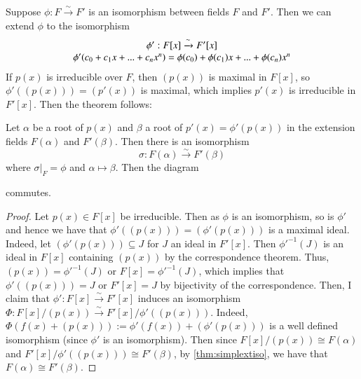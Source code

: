 \documentclass[12pt, a4paper, oneside, openright, titlepage]{book}
\begin{document}
\begin{rmk}
    Suppose $\phi:F\xrightarrow{\sim} F'$ is an isomorphism between fields $F$ and $F'$. Then we can extend $\phi$ to the isomorphism \begin{equation}
        \begin{array}{c} \phi':F[x]\xrightarrow{\sim}{F'[x]} \\ \phi'(c_0+c_1x+...+c_nx^n) = \phi(c_0)+\phi(c_1)x+...+\phi(c_n)x^n \end{array}
    \end{equation}
    If $p(x)$ is irreducible over $F$, then $(p(x))$ is maximal in $F[x]$, so $\phi'((p(x))) = (p'(x))$ is maximal, which implies $p'(x)$ is irreducible in $F'[x]$. Then the theorem follows:
\end{rmk}


\begin{thm}
    Let $\alpha$ be a root of $p(x)$ and $\beta$ a root of $p'(x) = \phi'(p(x))$ in the extension fields $F(\alpha)$ and $F'(\beta)$. Then there is an isomorphism \begin{equation}
        \sigma:F(\alpha)\xrightarrow{\sim}F'(\beta)
    \end{equation}
    where $\sigma\rvert_F = \phi$ and $\alpha \mapsto \beta$. Then the diagram
        \begin{center}
        \end{center}
    commutes.
\end{thm}
\begin{proof}
    Let $p(x) \in F[x]$ be irreducible. Then as $\phi$ is an isomorphism, so is $\phi'$ and hence we have that $\phi'((p(x))) = (\phi'(p(x)))$ is a maximal ideal. Indeed, let $(\phi'(p(x))) \subseteq J$ for $J$ an ideal in $F'[x]$. Then ${\phi'}^{-1}(J)$ is an ideal in $F[x]$ containing $(p(x))$ by the correspondence theorem. Thus, $(p(x)) = {\phi'}^{-1}(J)$ or $F[x] = {\phi'}^{-1}(J)$, which implies that $\phi'((p(x))) = J$ or $F'[x] = J$ by bijectivity of the correspondence. Then, I claim that $\phi':F[x]\xrightarrow{\sim}F'[x]$ induces an isomorphism $\Phi:F[x]/(p(x))\xrightarrow{\sim}F'[x]/\phi'((p(x)))$. Indeed, $\Phi(f(x)+(p(x))) := \phi'(f(x))+(\phi'(p(x)))$ is a well defined isomorphism (since $\phi'$ is an isomorphism). Then since $F[x]/(p(x)) \cong F(\alpha)$ and $F'[x]/\phi'((p(x))) \cong F'(\beta)$, by \ref{thm:simplextiso}, we have that $F(\alpha) \cong F'(\beta)$.
\end{proof}
\end{document}
